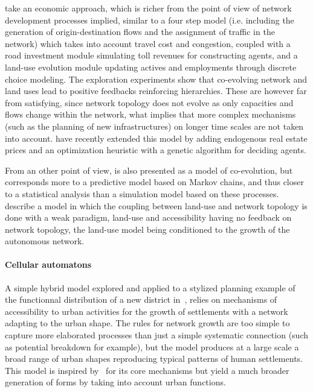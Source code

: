 \documentclass[11pt]{article}
\begin{document}
\cite{levinson2007co} take an economic approach, which is richer from the point of view of network development processes implied, similar to a four step model (i.e. including the generation of origin-destination flows and the assignment of traffic in the network) which takes into account travel cost and congestion, coupled with a road investment module simulating toll revenues for constructing agents, and a land-use evolution module updating actives and employments through discrete choice modeling. The exploration experiments show that co-evolving network and land uses lead to positive feedbacks reinforcing hierarchies. These are however far from satisfying, since network topology does not evolve as only capacities and flows change within the network, what implies that more complex mechanisms (such as the planning of new infrastructures) on longer time scales are not taken into account. \cite{li2016integrated} have recently extended this model by adding endogenous real estate prices and an optimization heuristic with a genetic algorithm for deciding agents.


From an other point of view, \citep{levinson2005paving} is also presented as a model of co-evolution, but corresponds more to a predictive model based on Markov chains, and thus closer to a statistical analysis than a simulation model based on these processes. \cite{rui2011urban} describe a model in which the coupling between land-use and network topology is done with a weak paradigm, land-use and accessibility having no feedback on network topology, the land-use model being conditioned to the growth of the autonomous network.




\paragraph{Cellular automatons}


A simple hybrid model explored and applied to a stylized planning example of the functionnal distribution of a new district in~\citep{raimbault2014hybrid}, relies on mechanisms of accessibility to urban activities for the growth of settlements with a network adapting to the urban shape. The rules for network growth are too simple to capture more elaborated processes than just a simple systematic connection (such as potential breakdown for example), but the model produces at a large scale a broad range of urban shapes reproducing typical patterns of human settlements. This model is inspired by~\citep{moreno2012automate} for its core mechanisms but yield a much broader generation of forms by taking into account urban functions.
\end{document}
